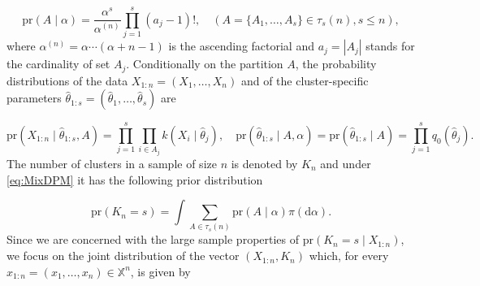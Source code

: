 \documentclass[12pt]{article}
\begin{document}
\begin{equation}\label{eq:EPPFDP}
\text{pr}(A \mid \alpha)=\dfrac{\alpha^s}{\alpha^{(n)}} \prod_{j=1}^s (a_j-1)!, \quad (A=\{A_1,\ldots,A_s\} \in \tau_s(n), s \le n),
\end{equation}
where $\alpha^{(n)} = \alpha \cdots (\alpha+n-1)$ is the ascending factorial and $a_j=|A_j|$ stands for the cardinality of set $A_j$. Conditionally on the partition $A$, the probability distributions of the data $X_{1:n}=(X_1,\dots,X_n)$ and of the cluster-specific parameters $\hat{\theta}_{1:s} = ( \hat{\theta}_1,\ldots,\hat{\theta}_s)$ %
are %

\begin{equation}\label{partition_model}
\text{pr}(X_{1:n} \mid \hat{\theta}_{1:s}, A) = \prod_{j = 1}^s\prod_{i \in A_j} k(X_i \mid \hat{\theta}_j ), \quad
\text{pr}( \hat{\theta}_{1:s} \mid A, \alpha) = \text{pr}( \hat{\theta}_{1:s} \mid A) = \prod_{j = 1}^s q_0(\hat{\theta}_j).
\end{equation}
The number of clusters in a sample of size $n$ is denoted by $K_n$ and under \eqref{eq:MixDPM} it has the following prior distribution 

\[
\text{pr}( K_n = s) = \int \sum_{A \in \tau_s(n)} \text{pr}( A \mid \alpha )\pi(\mathrm{d}\alpha).
\]
Since we %
are concerned with the large sample properties of %
$\text{pr}(K_n = s \mid X_{1:n})$, %
we focus on the joint distribution of the vector $(X_{1:n}, K_n)$ which, for every $x_{1:n}=(x_1,\dots,x_n)\in \mathbb{X}^n$, is given by
\end{document}
